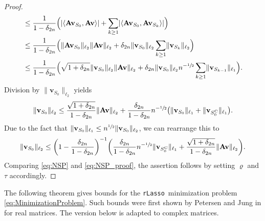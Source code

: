 \documentclass[11pt,reqno, a4paper]{article}
\numberwithin{equation}{section}
\newcommand{\rlasso}{\texttt{rLasso}}
\begin{document}
\begin{proof}
\begin{align}
\begin{split}
&\leq\frac{1}{1-\delta_{2n}} \Big( \lvert\langle \mathbf{A}\mathbf{v}_{S_0}, \mathbf{A}\mathbf{v} \rangle\rvert + \sum \limits_{k\geq 1} \lvert\langle \mathbf{A}\mathbf{v}_{S_0},\mathbf{A}\mathbf{v}_{S_k}\rangle\rvert \Big)\\
&\leq\frac{1}{1-\delta_{2n}} \Big( \lVert\mathbf{A}\mathbf{v}_{S_0}\rVert_{\ell_2} \lVert\mathbf{A}\mathbf{v}\rVert_{\ell_2} + \delta_{2n} \lVert\mathbf{v}_{S_0}\rVert_{\ell_2} \sum_{k\geq 1}  \lVert\mathbf{v}_{S_k}\rVert_{\ell_2} \Big)\\
&\leq\frac{1}{1-\delta_{2n}} \Big( \sqrt{1+\delta_{2n}}\lVert\mathbf{v}_{S_0}\rVert_{\ell_2} \lVert\mathbf{A}\mathbf{v}\rVert_{\ell_2} +\delta_{2n} \lVert\mathbf{v}_{S_0}\rVert_{\ell_2}n^{-\sfrac{1}{2}}\sum \limits_{k\geq 1} \lVert\mathbf{v}_{S_{k-1}}\rVert_{\ell_1}\Big).
\end{split}
\end{align}
Division by $\lVert\mathbf{v}_{S_0}\rVert_{\ell_2}$ yields
\begin{gather}
    \lVert\mathbf{v}_{S_0}\rVert_{\ell_2}\leq\frac{\sqrt{1+\delta_{2n}}}{1-\delta_{2n}}\lVert\mathbf{A}\mathbf{v}\rVert_{\ell_2}+\frac{\delta_{2n}}{1-\delta_{2n}} n^{-\sfrac{1}{2}} \big(\lVert\mathbf{v}_{S_0}\rVert_{\ell_1}+ \lVert\mathbf{v}_{S_0^\mathrm{C}}\rVert_{\ell_1} \big).
\end{gather}
Due to the fact that $\lVert\mathbf{v}_{S_0}\rVert_{\ell_1} \leq n^{\sfrac{1}{2}} \lVert\mathbf{v}_{S_0}\rVert_{\ell_2}$, we can rearrange this to
\begin{gather}\label{eq:NSP_proof}
\lVert\mathbf{v}_{S_0}\rVert_{\ell_2}\leq\biggl(1-\frac{\delta_{2n}}{1-\delta_{2n}}\biggr)^{-1} \biggl (\frac{\delta_{2n}}{1-\delta_{2n}} n^{-\sfrac{1}{2}}\lVert\mathbf{v}_{S_0^\mathrm{C}}\rVert_{\ell_1} +  \frac{\sqrt{1+\delta_{2n}}}{1-\delta_{2n}}\lVert\mathbf{A}\mathbf{v}\rVert_{\ell_2} \biggr).
\end{gather}
Comparing \eqref{eq:NSP} and \eqref{eq:NSP_proof}, the assertion follows by setting $\varrho$ and $\tau$ accordingly. 
\end{proof}

The following theorem gives bounds for the \rlasso \ minimization problem \eqref{eq:MinimizationProblem}. Such bounds were first shown by Petersen and Jung in \cite[Thm.\ 3.1]{PeJu22} for real matrices. The version below is adapted to complex matrices.
\end{document}
